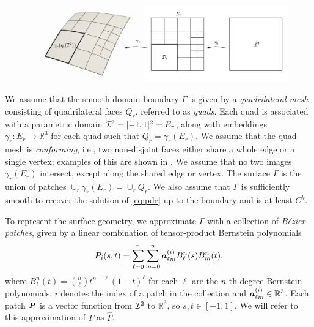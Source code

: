 \begin{figure}[!htb]
  \centering
  \begin{minipage}{\textwidth}
      \includegraphics[width=\linewidth]{figs/quadrisection.pdf}
  \end{minipage}\hfill
\end{figure}
We assume that the smooth domain boundary $\Gamma$ is given by a \textit{quadrilateral mesh} consisting of quadrilateral faces $Q_r$, referred to as \textit{quads}.
Each quad is associated with a parametric domain ${\mathcal{I}}^2 =  [-1,1]^2 = E_r$, along with embeddings $\gamma_r : E_r \to \mathbb{R}^3$ for each quad such that $Q_r = \gamma_r(E_r)$.  
We assume that the quad mesh is \textit{conforming}, i.e., two non-disjoint faces either share a whole edge or a single vertex; examples of this are shown in .
We assume that no two images $\gamma_r(E_r)$ intersect, except along the shared edge or vertex.
The surface $\Gamma$ is the union of patches $\cup_r \gamma_r(E_r) = \cup_r Q_r$.
We also assume that $\Gamma$ is sufficiently smooth to recover the solution of \cref{eq:pde} up to the boundary \cite{K} and is at least $C^k$. 

To represent the surface geometry, we approximate $\Gamma$ with a collection of \emph{B\'ezier patches}, given by a linear combination of tensor-product Bernstein polynomials
\begin{equation}
    {\bm{P}}_i(s,t) = \sum_{\ell =0}^n\sum_{m =0}^n \bm{a}^{(i)}_{\ell m }B_\ell^n(s)B_m^n(t),
  \label{eq:tensor-product}
\end{equation}
where  $B_\ell^n(t) = \binom{n}{\ell} t^{n-\ell}(1-t)^{\ell}$ for each $\ell$ are the $n$-th degree Bernstein polynomials, $i$ denotes the index of a patch in the collection and $\bm{a}_{\ell m}^{(i)} \in \mathbb{R}^3$.
Each patch ${\bm{P}}$ is a vector function from ${\mathcal{I}}^2$ to $\mathbb{R}^3$, so $s,t\in [-1,1]$.
We will refer to this approximation of $\Gamma$ as $\hat{\Gamma}$. %

